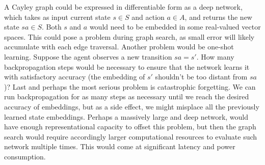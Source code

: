 \documentclass[12pt]{article}
\begin{document}
A Cayley graph could be expressed in differentiable form as a deep network, which takes as input current state $s\in S$ and action $a\in A$, and returns the new state $sa\in S$.  Both $s$ and $a$ would need to be embedded in some real-valued vector spaces. This could pose a problem during graph search, as small error will likely accumulate with each edge traversal. Another problem would be one-shot learning. Suppose the agent observes a new transition $sa=s'$. How many backpropagation steps would be necessary to ensure that the network learns it with satisfactory accuracy (the embedding of $s'$ shouldn't be too distant from $sa$)? Last and perhaps the most serious problem is catastrophic forgetting. We can run backpropagation for as many steps as necessary until we reach the desired accuracy of embeddings, but as a side effect, we might misplace all the previously learned state embeddings. Perhaps a massively large and deep network, would have enough representational capacity to offset this problem, but then the graph search would require accordingly larger computational resources to evaluate such network multiple times. This would come at significant latency and power consumption. 
\end{document}
